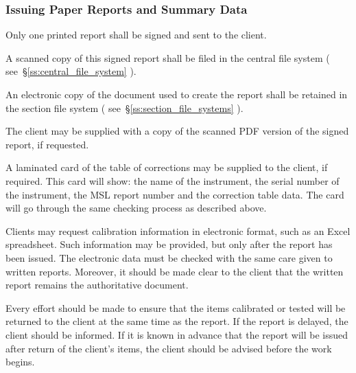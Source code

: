 \subsubsection{Issuing Paper Reports and Summary Data}

Only one printed report shall be signed and sent to the client. 

A scanned copy of this signed report shall be filed in the central file system ( see~\S\ref{ss:central_file_system} ). 

An electronic copy of the document used to create the report shall be retained in the section file system ( see~\S\ref{ss:section_file_systems} ). 
   
The client may be supplied with a copy of the scanned PDF version of the signed report, if requested.

A laminated card of the table of corrections may be supplied to the client, if required.  This card will show: the name of the instrument, the serial number of the instrument, the MSL report number and the correction table data.  The card will go through the same checking process as described above.

Clients may request calibration information in electronic format, such as an Excel spreadsheet. Such information may be provided, but only after the report has been issued. The electronic data must be checked with the same care given to written reports. Moreover, it should be made clear to the client that the written report remains the authoritative document. 

Every effort should be made to ensure that the items calibrated or tested will be returned to the client at the same time as the report. If the report is delayed, the client should be informed. If it is known in advance that the report will be issued after return of the client’s items, the client should be advised before the work begins.


